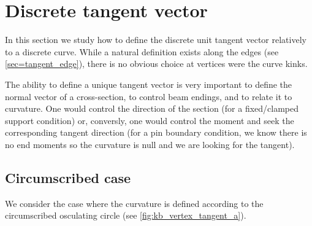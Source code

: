 \section{Discrete tangent vector}\label{sec=discrete_tangent}

In this section we study how to define the discrete unit tangent vector relatively to a discrete curve. While a natural definition exists along the edges (see \cref{sec=tangent_edge}), there is no obvious choice at vertices were the curve kinks.

The ability to define a unique tangent vector is very important to define the normal vector of a cross-section, to control beam endings, and to relate it to curvature. One would control the direction of the section (for a fixed/clamped support condition) or, conversly, one would control the moment and seek the corresponding tangent direction (for a pin boundary condition, we know there is no end moments so the curvature is null and we are looking for the tangent).

\subsection{Circumscribed case}\label{sec=discrete_tangent_circumscribed}

We consider the case where the curvature is defined according to the circumscribed osculating circle (see \cref{fig:kb_vertex_tangent_a}).


